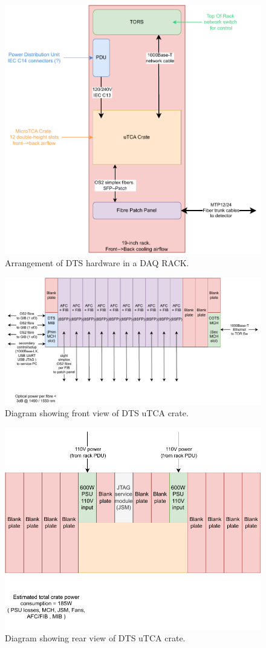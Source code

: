 \documentclass[fleqn,12pt,a4paper]{olplainarticle}
\begin{document}
\begin{figure}[ht]
\centering
\includegraphics[width=0.7\linewidth]{dts_overall_rack-v1-231215.drawio.pdf}
\caption{Arrangement of DTS hardware in a DAQ RACK.}
\label{fig:dts_crate_block_diagram}
\end{figure}

\begin{figure}
  \centering
  \includegraphics[width=\linewidth]{dts_utca_crate-front-v1-231215.drawio.pdf}
  \caption{Diagram showing front view of DTS uTCA crate.}
  \label{fig:dts-utca-front-view}
\end{figure}

\begin{figure}
  \centering
  \includegraphics[width=0.8\linewidth]{dts_utca_crate-rear-v1-231215.drawio.pdf}
  \caption{Diagram showing rear view of DTS uTCA crate.}
  \label{fig:dts-utca-rear-view}
\end{figure}
\end{document}
